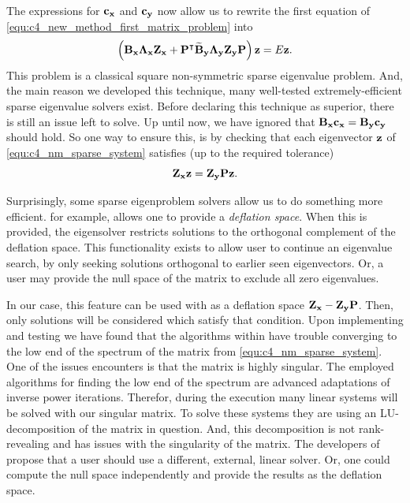The expressions for $\vb{c_x}$ and $\vb{c_y}$ now allow us to rewrite the first equation of \eqref{equ:c4_new_method_first_matrix_problem} into
\begin{equation}\label{equ:c4_nm_sparse_system}
    \left(\vb{B_x}\vb{\Lambda_x} \vb{Z_x} + {\vb{P}}^\intercal\vb{\widetilde{B}_y}\vb{\Lambda_y}  \vb{Z_y} \vb{P}\right) \vb{z} = E \vb{z} \text{.}
\end{equation}
This problem is a classical square non-symmetric sparse eigenvalue problem. And, the main reason we developed this technique, many well-tested extremely-efficient sparse eigenvalue solvers exist. Before declaring this technique as superior, there is still an issue left to solve. Up until now, we have ignored that $\vb{B_x} \vb{c_x} = \vb{B_y} \vb{c_y}$ should hold. So one way to ensure this, is by checking that each eigenvector $\vb{z}$ of \eqref{equ:c4_nm_sparse_system} satisfies (up to the required tolerance)
$$
    \vb{Z_x} \vb{z} = \vb{Z_y} \vb{P} \vb{z} \text{.}
$$

Surprisingly, some sparse eigenproblem solvers allow us to do something more efficient.  for example, allows one to provide a \emph{deflation space}. When this is provided, the eigensolver restricts solutions to the orthogonal complement of the deflation space. This functionality exists to allow user to continue an eigenvalue search, by only seeking solutions orthogonal to earlier seen eigenvectors. Or, a user may provide the null space of the matrix to exclude all zero eigenvalues.

In our case, this feature can be used with as a deflation space $\vb{Z_x} - \vb{Z_y} \vb{P}$. Then, only solutions will be considered which satisfy that condition. Upon implementing and testing we have found that the algorithms within \slepc have trouble converging to the low end of the spectrum of the matrix from \eqref{equ:c4_nm_sparse_system}. One of  the issues \slepc encounters is that the matrix is highly singular. The employed algorithms for finding the low end of the spectrum are advanced adaptations of inverse power iterations. Therefor, during the execution many linear systems will be solved with our singular matrix. To solve these systems they are using an LU-decomposition of the matrix in question. And, this decomposition is not rank-revealing and has issues with the singularity of the matrix. The developers of \slepc propose that a user should use a different, external, linear solver. Or, one could compute the null space independently and provide the results as the deflation space.

